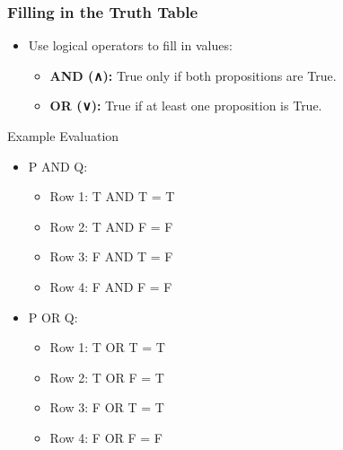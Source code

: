 \documentclass[aspectratio=169]{beamer}
\begin{document}
\begin{frame}[fragile]
    \frametitle{Filling in the Truth Table}
    \begin{itemize}
        \item Use logical operators to fill in values:
        \begin{itemize}
            \item \textbf{AND (∧):} True only if both propositions are True.
            \item \textbf{OR (∨):} True if at least one proposition is True.
        \end{itemize}
    \end{itemize}
    
    \begin{block}{Example Evaluation}
        \begin{itemize}
            \item P AND Q:
            \begin{itemize}
                \item Row 1: T AND T = T
                \item Row 2: T AND F = F
                \item Row 3: F AND T = F
                \item Row 4: F AND F = F
            \end{itemize}
            \item P OR Q:
            \begin{itemize}
                \item Row 1: T OR T = T
                \item Row 2: T OR F = T
                \item Row 3: F OR T = T
                \item Row 4: F OR F = F
            \end{itemize}
        \end{itemize}
    \end{block}
\end{frame}
\end{document}
